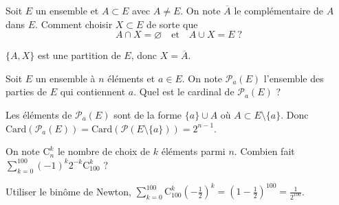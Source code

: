 \begin{question}

Soit $E$ un ensemble et $A\subset E$ avec $A\neq E$. On note $\overline{A}$ le complémentaire de $A$ dans $E$. Comment choisir $X\subset E$ de sorte que
$$A\cap X=\varnothing \quad \mbox{et}\quad A\cup X=E \; ?$$
\begin{answers}  
\end{answers}
\begin{explanations}
$\{A,X\}$ est une partition de $E$, donc $X=\overline{A}$.
\end{explanations}
\end{question}



\begin{question}

Soit $E$ un ensemble à $n$ éléments et $a\in E$. On note $\mathcal{P}_a(E)$ l'ensemble des parties de $E$ qui contiennent $a$. Quel est le cardinal de $\mathcal{P}_a(E)$ ?
\begin{answers}  
\end{answers}
\begin{explanations}
Les éléments de $\mathcal{P}_a(E)$ sont de la forme $\{a\}\cup A$ où $A\subset E\setminus \{a\}$. Donc $\mathrm{Card}(\mathcal{P}_a(E))=\mathrm{Card}(\mathcal{P}(E\setminus \{a\}))=2^{n-1}$.
\end{explanations}
\end{question}


\begin{question}

On note $\mathrm{C}^k_n$ le nombre de choix de $k$ éléments parmi $n$. Combien fait $\displaystyle \sum _{k=0}^{100}(-1)^k2^{-k}\mathrm{C}^k_{100}$ ?
\begin{answers}  
\end{answers}
\begin{explanations}
Utiliser le binôme de Newton, $\displaystyle \sum _{k=0}^{100}\mathrm{C}^k_{100}\left(-\frac{1}{2}\right)^k=\left(1-\frac{1}{2}\right)^{100}=\frac{1}{2^{100}}$.
\end{explanations}
\end{question}



